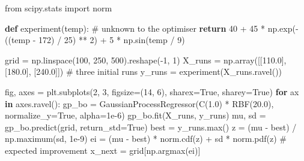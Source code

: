 \documentclass[
  letterpaper,
  DIV=11,
  numbers=noendperiod]{scrreprt}
\newenvironment{Shaded}{\begin{snugshade}}{\end{snugshade}}
\newcommand{\BuiltInTok}[1]{\textcolor[rgb]{0.00,0.23,0.31}{#1}}
\newcommand{\CommentTok}[1]{\textcolor[rgb]{0.37,0.37,0.37}{#1}}
\newcommand{\ControlFlowTok}[1]{\textcolor[rgb]{0.00,0.23,0.31}{\textbf{#1}}}
\newcommand{\DecValTok}[1]{\textcolor[rgb]{0.68,0.00,0.00}{#1}}
\newcommand{\FloatTok}[1]{\textcolor[rgb]{0.68,0.00,0.00}{#1}}
\newcommand{\ImportTok}[1]{\textcolor[rgb]{0.00,0.46,0.62}{#1}}
\newcommand{\KeywordTok}[1]{\textcolor[rgb]{0.00,0.23,0.31}{\textbf{#1}}}
\newcommand{\NormalTok}[1]{\textcolor[rgb]{0.00,0.23,0.31}{#1}}
\newcommand{\OperatorTok}[1]{\textcolor[rgb]{0.37,0.37,0.37}{#1}}
\newcommand{\VariableTok}[1]{\textcolor[rgb]{0.07,0.07,0.07}{#1}}
\begin{document}
\begin{Shaded}
\begin{Highlighting}[]
\ImportTok{from}\NormalTok{ scipy.stats }\ImportTok{import}\NormalTok{ norm}

\KeywordTok{def}\NormalTok{ experiment(temp):                       }\CommentTok{\# unknown to the optimiser}
    \ControlFlowTok{return} \DecValTok{40} \OperatorTok{+} \DecValTok{45} \OperatorTok{*}\NormalTok{ np.exp(}\OperatorTok{{-}}\NormalTok{((temp }\OperatorTok{{-}} \DecValTok{172}\NormalTok{) }\OperatorTok{/} \DecValTok{25}\NormalTok{) }\OperatorTok{**} \DecValTok{2}\NormalTok{) }\OperatorTok{+} \DecValTok{5} \OperatorTok{*}\NormalTok{ np.sin(temp }\OperatorTok{/} \DecValTok{9}\NormalTok{)}

\NormalTok{grid }\OperatorTok{=}\NormalTok{ np.linspace(}\DecValTok{100}\NormalTok{, }\DecValTok{250}\NormalTok{, }\DecValTok{500}\NormalTok{).reshape(}\OperatorTok{{-}}\DecValTok{1}\NormalTok{, }\DecValTok{1}\NormalTok{)}
\NormalTok{X\_runs }\OperatorTok{=}\NormalTok{ np.array([[}\FloatTok{110.0}\NormalTok{], [}\FloatTok{180.0}\NormalTok{], [}\FloatTok{240.0}\NormalTok{]])            }\CommentTok{\# three initial runs}
\NormalTok{y\_runs }\OperatorTok{=}\NormalTok{ experiment(X\_runs.ravel())}

\NormalTok{fig, axes }\OperatorTok{=}\NormalTok{ plt.subplots(}\DecValTok{2}\NormalTok{, }\DecValTok{3}\NormalTok{, figsize}\OperatorTok{=}\NormalTok{(}\DecValTok{14}\NormalTok{, }\DecValTok{6}\NormalTok{), sharex}\OperatorTok{=}\VariableTok{True}\NormalTok{, sharey}\OperatorTok{=}\VariableTok{True}\NormalTok{)}
\ControlFlowTok{for}\NormalTok{ ax }\KeywordTok{in}\NormalTok{ axes.ravel():}
\NormalTok{    gp\_bo }\OperatorTok{=}\NormalTok{ GaussianProcessRegressor(C(}\FloatTok{1.0}\NormalTok{) }\OperatorTok{*}\NormalTok{ RBF(}\FloatTok{20.0}\NormalTok{), normalize\_y}\OperatorTok{=}\VariableTok{True}\NormalTok{, alpha}\OperatorTok{=}\FloatTok{1e{-}6}\NormalTok{)}
\NormalTok{    gp\_bo.fit(X\_runs, y\_runs)}
\NormalTok{    mu, sd }\OperatorTok{=}\NormalTok{ gp\_bo.predict(grid, return\_std}\OperatorTok{=}\VariableTok{True}\NormalTok{)}
\NormalTok{    best }\OperatorTok{=}\NormalTok{ y\_runs.}\BuiltInTok{max}\NormalTok{()}
\NormalTok{    z }\OperatorTok{=}\NormalTok{ (mu }\OperatorTok{{-}}\NormalTok{ best) }\OperatorTok{/}\NormalTok{ np.maximum(sd, }\FloatTok{1e{-}9}\NormalTok{)}
\NormalTok{    ei }\OperatorTok{=}\NormalTok{ (mu }\OperatorTok{{-}}\NormalTok{ best) }\OperatorTok{*}\NormalTok{ norm.cdf(z) }\OperatorTok{+}\NormalTok{ sd }\OperatorTok{*}\NormalTok{ norm.pdf(z)       }\CommentTok{\# expected improvement}
\NormalTok{    x\_next }\OperatorTok{=}\NormalTok{ grid[np.argmax(ei)]}


\end{Highlighting}
\end{Shaded}
\end{document}
